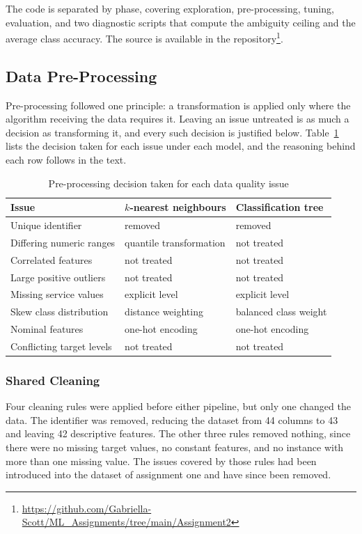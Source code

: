 \documentclass[conference]{IEEEtran}
\begin{document}
The code is separated by phase, covering exploration, pre-processing, tuning,
evaluation, and two diagnostic scripts that compute the ambiguity ceiling and
the average class accuracy. The source is available in the
repository\footnote{\url{https://github.com/Gabriella-Scott/ML_Assignments/tree/main/Assignment2}}.

\subsection{Data Pre-Processing}
\label{sec:preprocessing}

Pre-processing followed one principle: a transformation is applied only where
the algorithm receiving the data requires it. Leaving an issue untreated is as
much a decision as transforming it, and every such decision is justified below.
Table~\ref{tab:decisions} lists the decision taken for each issue under each
model, and the reasoning behind each row follows in the text.

\begin{table}[t]
\caption{Pre-processing decision taken for each data quality issue}
\label{tab:decisions}
\centering
\begin{tabular}{l l l}
\toprule
Issue & $k$-nearest neighbours & Classification tree \\
\midrule
Unique identifier      & removed            & removed \\
Differing numeric ranges & quantile transformation & not treated \\
Correlated features    & not treated        & not treated \\
Large positive outliers & not treated       & not treated \\
Missing service values & explicit level     & explicit level \\
Skew class distribution & distance weighting & balanced class weight \\
Nominal features       & one-hot encoding   & one-hot encoding \\
Conflicting target levels & not treated     & not treated \\
\bottomrule
\end{tabular}
\end{table}

\subsubsection{Shared Cleaning}
Four cleaning rules were applied before either pipeline, but only one changed
the data. The identifier was removed, reducing the dataset from 44 columns to
43 and leaving 42 descriptive features. The other three rules removed nothing,
since there were no missing target values, no constant features, and no
instance with more than one missing value. The issues covered by those rules
had been introduced into the dataset of assignment one and have since been
removed.
\end{document}
